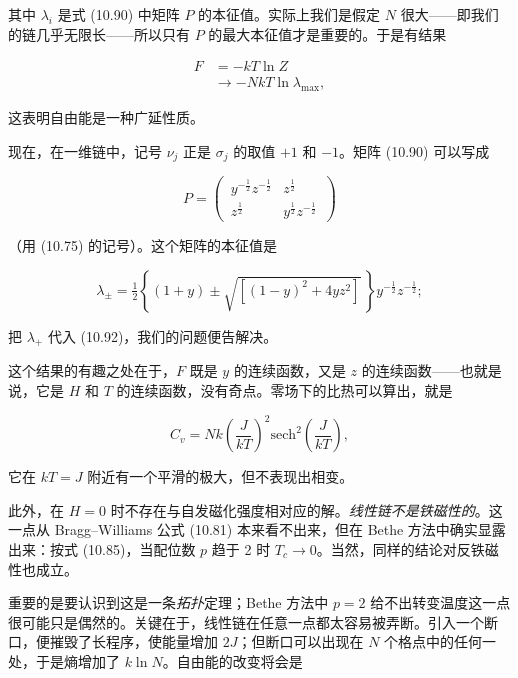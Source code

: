 其中 $\lambda_i$ 是式 (10.90) 中矩阵 $P$ 的本征值。实际上我们是假定 $N$ 很大——即我们的链几乎无限长——所以只有 $P$ 的最大本征值才是重要的。于是有结果

\begin{align*}
F &= -kT\ln Z\\
&\to -NkT\ln\lambda_{\max},
\tag{10.92}
\end{align*}

这表明自由能是一种广延性质。

现在，在一维链中，记号 $\nu_j$ 正是 $\sigma_j$ 的取值 $+1$ 和 $-1$。矩阵 (10.90) 可以写成

\begin{equation*}
P = \begin{pmatrix}\, y^{-\frac{1}{2}}z^{-\frac{1}{2}} & z^{\frac{1}{2}}\,\\[2pt]\, z^{\frac{1}{2}} & y^{\frac{1}{2}}z^{-\frac{1}{2}}\, \end{pmatrix}
\tag{10.93}
\end{equation*}

（用 (10.75) 的记号）。这个矩阵的本征值是

\begin{equation*}
\lambda_{\pm} = \tfrac{1}{2}\left\{(1+y) \pm \sqrt{\left[(1-y)^2 + 4yz^2\right]}\,\right\} y^{-\frac{1}{2}}z^{-\frac{1}{2}};
\tag{10.94}
\end{equation*}

把 $\lambda_+$ 代入 (10.92)，我们的问题便告解决。

这个结果的有趣之处在于，$F$ 既是 $y$ 的连续函数，又是 $z$ 的连续函数——也就是说，它是 $H$ 和 $T$ 的连续函数，没有奇点。零场下的比热可以算出，就是

\begin{equation*}
C_v = Nk\left(\frac{J}{kT}\right)^{2}\mathrm{sech}^2\left(\frac{J}{kT}\right),
\tag{10.95}
\end{equation*}

它在 $kT = J$ 附近有一个平滑的极大，但不表现出相变。

此外，在 $H = 0$ 时不存在与自发磁化强度相对应的解。\emph{线性链不是铁磁性的}。这一点从 Bragg--Williams 公式 (10.81) 本来看不出来，但在 Bethe 方法中确实显露出来：按式 (10.85)，当配位数 $p$ 趋于 2 时 $T_c \to 0$。当然，同样的结论对反铁磁性也成立。


重要的是要认识到这是一条\emph{拓扑}定理；Bethe 方法中 $p = 2$ 给不出转变温度这一点很可能只是偶然的。关键在于，线性链在任意一点都太容易被弄断。引入一个断口，便摧毁了长程序，使能量增加 $2J$；但断口可以出现在 $N$ 个格点中的任何一处，于是熵增加了 $k\ln N$。自由能的改变将会是

